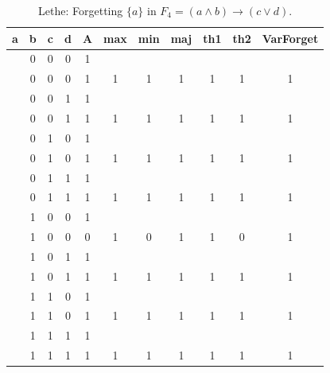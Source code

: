 \begin{table}[!tb]
    \centering
    \begin{tabular}{|c|c|c|c|c|c|c|c|c|c|c|}
        \hline
        \textbf{a} & \textbf{b} & \textbf{c} & \textbf{d} & \textbf{A} & \textbf{max} & \textbf{min} & \textbf{maj} & \textbf{th1} & \textbf{th2} & \textbf{VarForget} \\ \hline
        \rowcolor{gray!40}  & 0 & 0 & 0 & 1 &  &  &  &  &  &  \\ \hline
        \rowcolor{gray!40}  & 0 & 0 & 0 & 1 & 1 & 1 & 1 & 1 & 1 & 1 \\ \hline
        \rowcolor{blue!40}  & 0 & 0 & 1 & 1 &  &  &  &  &  &  \\ \hline
        \rowcolor{blue!40}  & 0 & 0 & 1 & 1 & 1 & 1 & 1 & 1 & 1 & 1 \\ \hline
        \rowcolor{red!40}  & 0 & 1 & 0 & 1 &  &  &  &  &  &  \\ \hline
        \rowcolor{red!40}  & 0 & 1 & 0 & 1 & 1 & 1 & 1 & 1 & 1 & 1 \\ \hline
        \rowcolor{green!40}  & 0 & 1 & 1 & 1 &  &  &  &  &  &  \\ \hline
        \rowcolor{green!40}  & 0 & 1 & 1 & 1 & 1 & 1 & 1 & 1 & 1 & 1 \\ \hline
        \rowcolor{yellow!40}  & 1 & 0 & 0 & 1 &  &  &  &  &  &  \\ \hline
        \rowcolor{yellow!40}  & 1 & 0 & 0 & 0 & 1 & 0 & 1 & 1 & 0 & 1 \\ \hline
        \rowcolor{gray!40}  & 1 & 0 & 1 & 1 &  &  &  &  &  &  \\ \hline
        \rowcolor{gray!40}  & 1 & 0 & 1 & 1 & 1 & 1 & 1 & 1 & 1 & 1 \\ \hline
        \rowcolor{blue!40}  & 1 & 1 & 0 & 1 &  &  &  &  &  &  \\ \hline
        \rowcolor{blue!40}  & 1 & 1 & 0 & 1 & 1 & 1 & 1 & 1 & 1 & 1 \\ \hline
        \rowcolor{red!40}  & 1 & 1 & 1 & 1 &  &  &  &  &  &  \\ \hline
        \rowcolor{red!40}  & 1 & 1 & 1 & 1 & 1 & 1 & 1 & 1 & 1 & 1 \\ \hline
    \end{tabular}
    \caption{Lethe: Forgetting $\{a\}$ in $F_{4} = (a \land b) \rightarrow (c \lor d)$.}
    \label{tab:lethe-F4-a}
\end{table}
